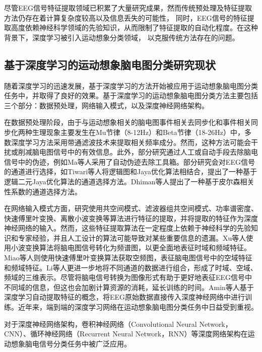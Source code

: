 尽管EEG信号特征提取领域已积累了大量研究成果，然而传统预处理及特征提取方法仍存在着计算复杂度较高以及信息丢失的可能性，
同时，EEG信号的特征提取高度依赖神经科学领域的先验知识，从而限制了特征提取的自动化程度\cite{altaheri2023deep}。在这种背景下，深度学习被引入运动想象分类领域，
以克服传统方法存在的问题。

\subsection{基于深度学习的运动想象脑电图分类研究现状}

随着深度学习的迅速发展，基于深度学习的方法开始被应用于运动想象脑电图分类任务中，并取得了良好的效果。基于深度学习的运动想象脑电图分类方法主要包括三个部分：数据预处理，网络输入模式，以及深度神经网络架构。

在数据预处理阶段，由于与运动想象相关的脑电图事件相关去同步化和事件相关同步化两种生理现象主要发生在Mu节律（8-12Hz）和Beta节律（18-26Hz）中\cite{altaheri2023deep}，多数深度学习方法采用带通滤波技术来提取相关频率成分。然而，这种方法可能会干扰或削减脑电图信号中的有效信息。此外，部分研究通过人工或自动手段去除脑电信号中的伪迹，例如Ma等人\cite{ma2019deep}采用了自动伪迹去除工具箱\cite{gomez2006automatic}。部分研究会对EEG信号的通道进行选择，如Tiwari等人\cite{tiwari2023logistic}将逻辑图和Jaya优化算法\cite{7838661}相结合，提出了一种基于逻辑二元Jaya优化算法的通道选择方法。Dhiman等人\cite{dhiman2023electroencephalogram}提出了一种基于皮尔森相关性系数的通道选择方法。

在网络输入模式方面，研究\cite{luo2018exploring,olivas2019classification,she2019hierarchical,ma2020dwt,chu2018decoding,hassanpour2019novel}使用共空间模式、滤波器组共空间模式、功率谱密度、快速傅里叶变换、离散小波变换等算法进行特征的提取，并将提取的特征作为深度神经网络的输入。然而，这些特征提取算法在一定程度上依赖于神经科学的先验知识和专家经验，并且人工设计的算法可能导致对某些重要信息的遗漏。Xu等人\cite{xu2018wavelet}使用小波变换算法将脑电图信号转化为频谱图，以更全面地表征时域和频域特征。Miao等人\cite{miao2020spatial}则使用快速傅里叶变换算法获取空频图，表征脑电图信号中的空域特征和频域特征。Li等人\cite{li2020novel}更进一步地将不同通道的数据进行组合，形成了时域、空域、频域的三维表示。尽管将脑电信号转换为图像形式有助于更好地表征EEG信号中不同域的信息，但这也会加剧计算资源的消耗，延长训练的时间。Amin等人\cite{amin2019deep}基于深度学习自动提取特征的概念，将EEG原始数据直接传入深度神经网络中进行训练。近年来，端到端的深度学习网络在运动想象脑电图分类任务中日益受到重视。

对于深度神经网络架构，卷积神经网络（Convolutional Neural Network， CNN）、循环神经网络（Recurrent Neural Network，RNN）等深度网络架构在运动想象脑电信号分类任务中被广泛应用。

